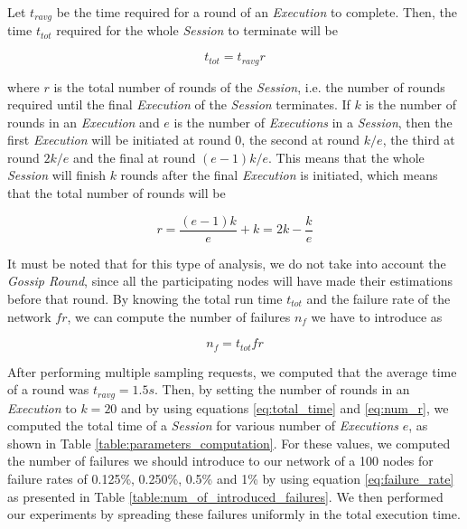 \documentclass[a4paper,11pt,twoside]{report}
\begin{document}
Let $t_{ravg}$ be the time required for a round of an \textit{Execution} to complete. Then, the time $t_{tot}$ required for the whole \textit{Session} to terminate will be 

\begin{equation}
\label{eq:total_time}
t_{tot} = t_{ravg} r
\end{equation}

where $r$ is the total number of rounds of the \textit{Session}, i.e. the number of rounds required until the final \textit{Execution} of the \textit{Session} terminates. If $k$ is the number of rounds in an \textit{Execution} and $e$ is the number of \textit{Executions} in a \textit{Session}, then the first \textit{Execution} will be initiated at round 0, the second at round $k/e$, the third at round $ 2k/e$ and the final at round $ (e-1)k/e$. This means that the whole \textit{Session} will finish $k$ rounds after the final \textit{Execution} is initiated, which means that the total number of rounds will be

\begin{equation}
\label{eq:num_r}
r = \frac{(e-1)k}{e} + k = 2k - \frac{k}{e}
\end{equation}

It must be noted that for this type of analysis, we do not take into account the \textit{Gossip Round}, since all the participating nodes will have made their estimations before that round. By knowing the total run time $t_{tot}$ and the failure rate of the network $fr$, we can compute the number of failures $n_f$ we have to introduce as

\begin{equation}
\label{eq:failure_rate}
n_f = t_{tot}fr
\end{equation}

After performing multiple sampling requests, we computed that the average time of a round was $t_{ravg}=1.5s$. Then, by setting the number of rounds in an \textit{Execution} to $k=20$ and by using equations \ref{eq:total_time} and \ref{eq:num_r}, we computed the total time of a \textit{Session} for various number of \textit{Executions} $e$, as shown in Table \ref{table:parameters_computation}. For these values, we computed the number of failures we should introduce to our network of a 100 nodes for failure rates of 0.125\%, 0.250\%, 0.5\% and 1\% by using equation \ref{eq:failure_rate} as presented in Table \ref{table:num_of_introduced_failures}. We then performed our experiments by spreading these failures uniformly in the total execution time.\\
\end{document}
